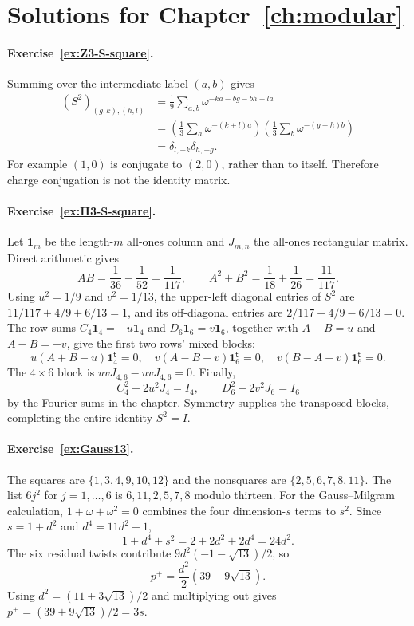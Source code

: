 \section{Solutions for Chapter~\ref{ch:modular}}

\paragraph{Exercise~\ref{ex:Z3-S-square}.}
\label{sol:ex:Z3-S-square}
Summing over the intermediate label $(a,b)$ gives
\begin{align*}
 (S^2)_{(g,k),(h,l)}
 &=\frac19\sum_{a,b}\omega^{-ka-bg-bh-la}\\
 &=\left(\frac13\sum_a\omega^{-(k+l)a}\right)
   \left(\frac13\sum_b\omega^{-(g+h)b}\right)\\
 &=\delta_{l,-k}\delta_{h,-g}.
\end{align*}
For example $(1,0)$ is conjugate to $(2,0)$, rather than to
itself.  Therefore charge conjugation is not the identity matrix.



\paragraph{Exercise~\ref{ex:H3-S-square}.}
\label{sol:ex:H3-S-square}
Let $\mathbf1_m$ be the length-$m$ all-ones column and $J_{m,n}$
the all-ones rectangular matrix. Direct arithmetic gives
\[
 AB=\frac1{36}-\frac1{52}=\frac1{117},\qquad
 A^2+B^2=\frac1{18}+\frac1{26}=\frac{11}{117}.
\]
Using $u^2=1/9$ and $v^2=1/13$, the upper-left diagonal entries
of $S^2$ are
$11/117+4/9+6/13=1$, and its off-diagonal entries are
$2/117+4/9-6/13=0$.
The row sums $C_4\mathbf1_4=-u\mathbf1_4$ and
$D_6\mathbf1_6=v\mathbf1_6$, together with
$A+B=u$ and $A-B=-v$, give the first two rows' mixed blocks:
\[
 u(A+B-u)\mathbf1_4^{\mathsf t}=0,
 \quad v(A-B+v)\mathbf1_6^{\mathsf t}=0,
 \quad v(B-A-v)\mathbf1_6^{\mathsf t}=0.
\]
The $4\times6$ block is
$uvJ_{4,6}-uvJ_{4,6}=0$. Finally,
\[
 C_4^2+2u^2J_4=I_4,\qquad
 D_6^2+2v^2J_6=I_6
\]
by the Fourier sums in the chapter. Symmetry supplies the
transposed blocks, completing the entire identity $S^2=I$.



\paragraph{Exercise~\ref{ex:Gauss13}.}
\label{sol:ex:Gauss13}
The squares are $\{1,3,4,9,10,12\}$ and the nonsquares are
$\{2,5,6,7,8,11\}$.  The list $6j^2$ for $j=1,\ldots,6$
is $6,11,2,5,7,8$ modulo thirteen.  For the Gauss--Milgram
calculation, $1+\omega+\omega^2=0$ combines the four
dimension-$s$ terms to $s^2$. Since $s=1+d^2$ and
$d^4=11d^2-1$,
\[
 1+d^4+s^2=2+2d^2+2d^4=24d^2.
\]
The six residual twists contribute
$9d^2(-1-\sqrt{13})/2$, so
\[
 p^+=\frac{d^2}{2}(39-9\sqrt{13}).
\]
Using $d^2=(11+3\sqrt{13})/2$ and multiplying out gives
$p^+=(39+9\sqrt{13})/2=3s$.



